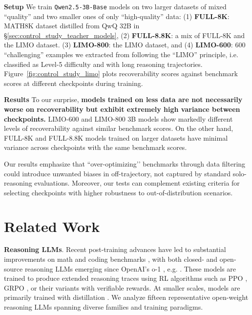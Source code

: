 \documentclass{article} %
\begin{document}
\textbf{Setup} We train \texttt{Qwen2.5-3B-Base} models on two larger datasets of mixed ``quality'' and two smaller ones of only ``high-quality'' data: (1) \textbf{FULL-8K}: MATH8K dataset distilled from QwQ 32B in \S \ref{sec:control_study_teacher_models}, (2) \textbf{FULL-8.8K}: a mix of FULL-8K and the LIMO dataset. (3) \textbf{LIMO-800}: the LIMO dataset, and (4) \textbf{LIMO-600}: 600 ``challenging''
examples we extracted from following the ``LIMO'' principle, i.e. classified as Level-5 difficulty and with long reasoning trajectories. Figure~\ref{fig:control_study_limo} plots recoverability scores against benchmark scores at different checkpoints during training.


\textbf{Results} 
To our surprise, \textbf{models trained on less data are not necessarily worse on recoverability but exhibit extremely high variance between checkpoints.} LIMO-600 and LIMO-800 3B models show markedly different levels of recoverability against similar benchmark scores. On the other hand, FULL-8K and FULL-8.8K models trained on larger datasets have minimal variance across checkpoints with the same benchmark scores. 

Our results emphasize that ``over-optimizing’’ benchmarks through data filtering could introduce unwanted biases in off-trajectory, not captured by standard solo-reasoning evaluations. Moreover, our tests can complement existing criteria for selecting checkpoints with higher robustness to out-of-distribution scenarios.

\section{Related Work}
\label{sec:related_work}
\textbf{Reasoning LLMs}. Recent post-training advances have led to substantial improvements on math and coding benchmarks \citep{huang2025gemini, guo2025deepseek}, with both closed- and open-source reasoning LLMs emerging since OpenAI's o-1 \citep{jaech2024openai}, e.g. \cite{guo2025deepseek,yang2025qwen3,guha2025openthoughts, ye2025limoreasoning,ji2025thinking}. These models are trained to produce extended reasoning traces using RL algorithms such as PPO \citep{schulman2017proximal}, GRPO \citep{shao2024deepseekmath}, or their variants with verifiable rewards. At smaller scales, models are primarily trained with distillation \citep{hinton2015distilling}. We analyze fifteen representative open-weight reasoning LLMs spanning diverse families and training paradigms.
\end{document}
